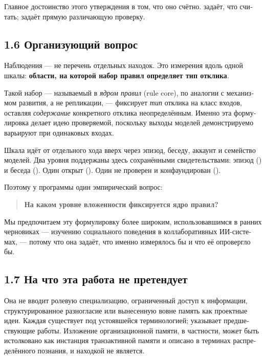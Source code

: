 \begin{russian}
Главное достоинство этого утверждения в том, что оно счётно.  задаёт, что считать;  задаёт прямую различающую проверку.


\subsection*{1.6 Организующий вопрос}
\label{sec:ru:1.6}

Наблюдения — не перечень отдельных находок. Это измерения вдоль одной шкалы: \textbf{области, на которой набор правил определяет тип отклика}.

Такой набор — называемый в  \emph{ядром правил} (rule core), по аналогии с механизмом развития, а не репликации, — фиксирует \emph{тип} отклика на класс входов, оставляя \emph{содержание} конкретного отклика неопределённым. Именно эта формулировка делает идею проверяемой, поскольку выходы моделей демонстрируемо варьируют при одинаковых входах.

Шкала идёт от отдельного хода вверх через эпизод, беседу, аккаунт и семейство моделей. Два уровня поддержаны здесь сохранёнными свидетельствами: эпизод () и беседа (). Один открыт (). Один не проверен и конфаундирован ().

Поэтому у программы один эмпирический вопрос:

\begin{quote}
\textbf{На каком уровне вложенности фиксируется ядро правил?}
\end{quote}
Мы предпочитаем эту формулировку более широким, использовавшимся в ранних черновиках — изучению социального поведения в коллаборативных ИИ-системах, — потому что она задаёт, что именно измерялось бы и что её опровергло бы.


\subsection*{1.7 На что эта работа не претендует}
\label{sec:ru:1.7}

Она не вводит ролевую специализацию, ограниченный доступ к информации, структурированное разногласие или вынесенную вовне память как проектные идеи. Каждая существует под устоявшейся терминологией;  указывает предшествующие работы. Изложение организационной памяти, в частности, может быть истолковано как инстанция транзактивной памяти и описано в терминах распределённого познания, и находкой не является.


\end{russian}
